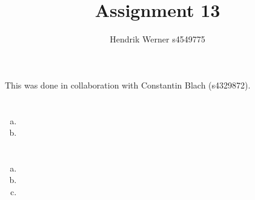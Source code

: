 \documentclass[12pt, a4paper]{article}
\title{Assignment 13}
\author{Hendrik Werner s4549775}
\begin{document}
\maketitle

This was done in collaboration with Constantin Blach (s4329872).

\section{} %
\begin{enumerate}[(a)]
	\item %
	\item %
\end{enumerate}

\section{} %

\section{} %

\section{} %
\begin{enumerate}[(a)]
	\item %
	\item %
	\item %
\end{enumerate}
\end{document}
